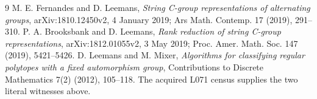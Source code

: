 \documentclass[11pt]{article}
\begin{document}
\begin{thebibliography}{9}
 M. E. Fernandes and D. Leemans,
\emph{String C-group representations of alternating groups},
arXiv:1810.12450v2, 4 January 2019; Ars Math. Contemp. 17 (2019),
291--310.
 P. A. Brooksbank and D. Leemans,
\emph{Rank reduction of string C-group representations},
arXiv:1812.01055v2, 3 May 2019; Proc. Amer. Math. Soc. 147
(2019), 5421--5426.
 D. Leemans and M. Mixer,
\emph{Algorithms for classifying regular polytopes with a fixed
automorphism group}, Contributions to Discrete Mathematics
7(2) (2012), 105--118. The acquired L071 census supplies the
two literal witnesses above.
\end{thebibliography}
\end{document}
